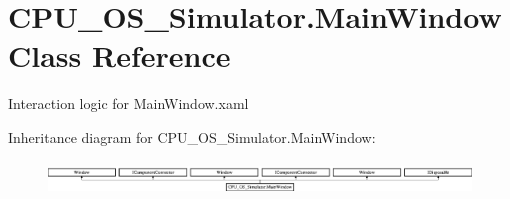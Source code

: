 \hypertarget{class_c_p_u___o_s___simulator_1_1_main_window}{}\section{C\+P\+U\+\_\+\+O\+S\+\_\+\+Simulator.\+Main\+Window Class Reference}
\label{class_c_p_u___o_s___simulator_1_1_main_window}


Interaction logic for Main\+Window.\+xaml  


Inheritance diagram for C\+P\+U\+\_\+\+O\+S\+\_\+\+Simulator.\+Main\+Window\+:\begin{figure}[H]
\begin{center}
\leavevmode
\includegraphics[height=0.910569cm]{class_c_p_u___o_s___simulator_1_1_main_window}
\end{center}
\end{figure}
